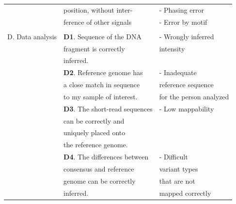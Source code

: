 \begin{table}[H]
\begin{minipage}{\textwidth}
\begin{tabular}{!{\color{deeporange}\VRule[3pt]}lll!{\color{deeporange}\VRule[3pt]}}
			& position, without inter- & - Phasing error \\
			& ference of other signals & - Error by motif \\
			& & \\
			\setrow{\bfseries}D. Data analysis  & \textbf{D1}. Sequence of the DNA & - Wrongly inferred  \\
			& fragment is correctly & intensity \\
			& inferred. & \\
			& \textbf{D2}. Reference genome has & - Inadequate   \\
			& a close match in sequence & reference sequence  \\
			& to my sample of interest.& for the person analyzed \\
			& \textbf{D3}. The short-read sequences & - Low mappability \\
			& can be correctly and & \\
			& uniquely placed onto & \\
			& the reference genome. & \\
			& \textbf{D4}. The differences between & - Difficult \\
			& consensus and reference & variant types \\
			& genome can be correctly & that are not \\
			& inferred. & mapped correctly\\
			\hline
		\end{tabular}
	\end{minipage}
\end{table}

